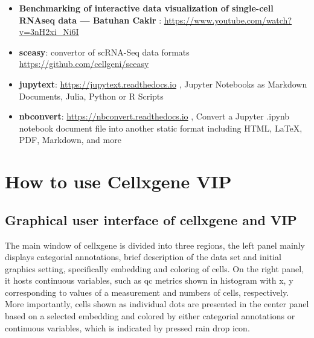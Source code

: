 \documentclass[
]{article}
\providecommand{\tightlist}{%
  \setlength{\itemsep}{0pt}\setlength{\parskip}{0pt}}
\begin{document}
\begin{itemize}
\tightlist
\item
  \textbf{Benchmarking of interactive data visualization of single-cell RNAseq data --- Batuhan Cakir} : \url{https://www.youtube.com/watch?v=3nH2xi_Ni6I}
\item
  \textbf{sceasy}: convertor of scRNA-Seq data formats \url{https://github.com/cellgeni/sceasy}
\item
  \textbf{jupytext}: \url{https://jupytext.readthedocs.io} , Jupyter Notebooks as Markdown Documents, Julia, Python or R Scripts
\item
  \textbf{nbconvert}: \url{https://nbconvert.readthedocs.io} , Convert a Jupyter .ipynb notebook document file into another static format including HTML, LaTeX, PDF, Markdown, and more
\end{itemize}

\hypertarget{how-to-use-cellxgene-vip}{%
\section{How to use Cellxgene VIP}\label{how-to-use-cellxgene-vip}}

\hypertarget{graphical-user-interface-of-cellxgene-and-vip}{%
\subsection{Graphical user interface of cellxgene and VIP}\label{graphical-user-interface-of-cellxgene-and-vip}}

The main window of cellxgene is divided into three regions, the left panel mainly displays categorial
annotations, brief description of the data set and initial graphics setting, specifically embedding and
coloring of cells. On the right panel, it hosts continuous variables, such as qc metrics shown in histogram
with x, y corresponding to values of a measurement and numbers of cells, respectively. More
importantly, cells shown as individual dots are presented in the center panel based on a selected
embedding and colored by either categorial annotations or continuous variables, which is indicated by
pressed rain drop icon.
\end{document}
